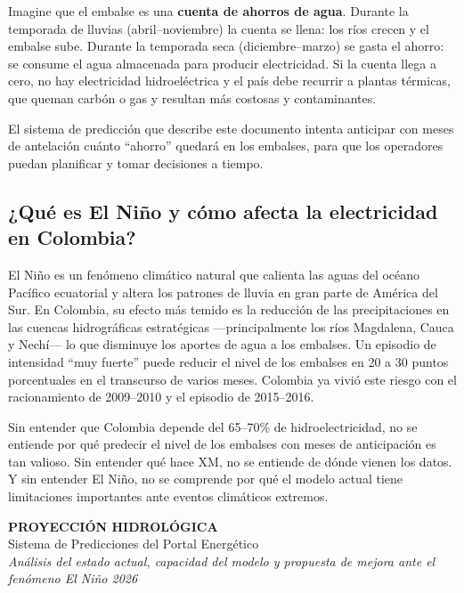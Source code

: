 \documentclass[11pt,a4paper]{article}
\begin{document}
\begin{highlightbox}
Imagine que el embalse es una \textbf{cuenta de ahorros de agua}. Durante la temporada de lluvias (abril--noviembre) la cuenta se llena: los ríos crecen y el embalse sube. Durante la temporada seca (diciembre--marzo) se gasta el ahorro: se consume el agua almacenada para producir electricidad. Si la cuenta llega a cero, no hay electricidad hidroeléctrica y el país debe recurrir a plantas térmicas, que queman carbón o gas y resultan más costosas y contaminantes.

El sistema de predicción que describe este documento intenta anticipar con meses de antelación cuánto ``ahorro'' quedará en los embalses, para que los operadores puedan planificar y tomar decisiones a tiempo.
\end{highlightbox}

\subsection*{¿Qué es El Niño y cómo afecta la electricidad en Colombia?}

El Niño es un fenómeno climático natural que calienta las aguas del océano Pacífico ecuatorial y altera los patrones de lluvia en gran parte de América del Sur. En Colombia, su efecto más temido es la reducción de las precipitaciones en las cuencas hidrográficas estratégicas —principalmente los ríos Magdalena, Cauca y Nechí— lo que disminuye los aportes de agua a los embalses. Un episodio de intensidad ``muy fuerte'' puede reducir el nivel de los embalses en 20 a 30 puntos porcentuales en el transcurso de varios meses. Colombia ya vivió este riesgo con el racionamiento de 2009--2010 y el episodio de 2015--2016.

\begin{alertbox}
Sin entender que Colombia depende del 65--70\% de hidroelectricidad, no se entiende por qué predecir el nivel de los embalses con meses de anticipación es tan valioso. Sin entender qué hace XM, no se entiende de dónde vienen los datos. Y sin entender El Niño, no se comprende por qué el modelo actual tiene limitaciones importantes ante eventos climáticos extremos.
\end{alertbox}

\newpage

\thispagestyle{empty}

\begin{center}
{\fontsize{28}{34}\selectfont\bfseries\color{titleblue} PROYECCIÓN HIDROLÓGICA}\\[4mm]
{\Large\color{gray} Sistema de Predicciones del Portal Energético}\\[2mm]
{\large\color{gray}\itshape Análisis del estado actual, capacidad del modelo y propuesta de mejora ante el fenómeno El Niño 2026}
\end{center}
\end{document}
